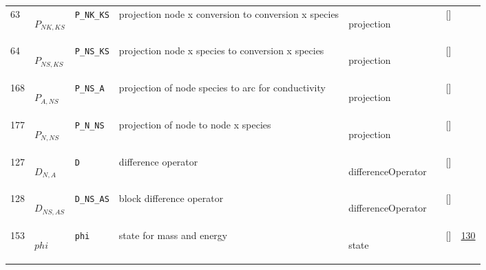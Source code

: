 \begin{longtable}{|p{1cm}|p{3cm}|p{3cm}|p{7cm}|p{3.0cm}|p{3cm}|p{2cm}|p{1cm}|}
    63
             & \hypertarget{"v:63"}{ $ {P}{_{{N K}, {K S}}} $}
             & \verb|P_NK_KS|
             & projection node x conversion to conversion x species
             & \begin{lay}projection \end{lay}
             & $  $
             & []
             & \\
    64
             & \hypertarget{"v:64"}{ $ {P}{_{{N S}, {K S}}} $}
             & \verb|P_NS_KS|
             & projection node x species to conversion x species
             & \begin{lay}projection \end{lay}
             & $  $
             & []
             & \\
    168
             & \hypertarget{"v:168"}{ $ {P}{_{A, {N S}}} $}
             & \verb|P_NS_A|
             & projection of node species to arc for conductivity
             & \begin{lay}projection \end{lay}
             & $  $
             & []
             & \\
    177
             & \hypertarget{"v:177"}{ $ {P}{_{N, {N S}}} $}
             & \verb|P_N_NS|
             & projection of node to node x species
             & \begin{lay}projection \end{lay}
             & $  $
             & []
             & \\
    127
             & \hypertarget{"v:127"}{ $ {D}{_{N, A}} $}
             & \verb|D|
             & difference operator
             & \begin{lay}differenceOperator \end{lay}
             & $  $
             & []
             & \\
    128
             & \hypertarget{"v:128"}{ $ {D}{_{{N S}, {A S}}} $}
             & \verb|D_NS_AS|
             & block difference operator
             & \begin{lay}differenceOperator \end{lay}
             & $  $
             & []
             & \\
    153
             & \hypertarget{"v:153"}{ $ {phi}{_{}} $}
             & \verb|phi|
             & state for mass and energy
             & \begin{lay}state \end{lay}
             & $  $
             & []
             & \hyperlink{"e:130"}{ 130 }
                 \\

\end{longtable}
